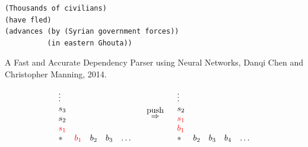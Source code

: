 {

\begin{verbatim}
(Thousands of civilians)
(have fled)
(advances (by (Syrian government forces))
          (in eastern Ghouta))
\end{verbatim}



A Fast and Accurate Dependency Parser using Neural Networks,
Danqi Chen and Christopher Manning, 2014.

\vfill
$$\begin{array}{lllll}
  \vdots \\
  s_3 \\
    s_2 \\
    {\color{red} s_1} \\
    * & {\color{red} b_1} & b_2 & b_3 & \ldots
  \end{array}
  \;\;\;\;
  \stackrel{\mbox{push}}{\Rightarrow}
  \;\;\;
  \begin{array}{lllll}
    \vdots \\
    s_2 \\
    {\color{red} s_1} \\
    {\color{red} b_1} \\
    * & b_2 & b_3 & b_4 & \ldots
  \end{array}$$


}
